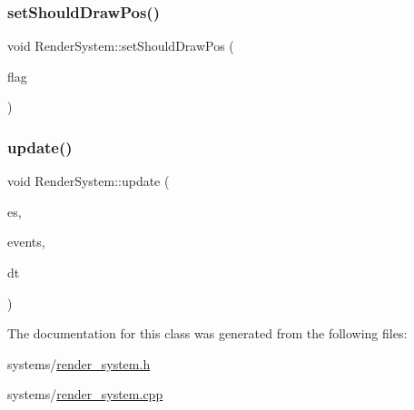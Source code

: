 \mbox{\label{classRenderSystem_a4877dc8f72b552e4127628fd91e3a06d}} 
\subsubsection{\texorpdfstring{set\+Should\+Draw\+Pos()}{setShouldDrawPos()}}
{\footnotesize\ttfamily void Render\+System\+::set\+Should\+Draw\+Pos (\begin{DoxyParamCaption}\item[{bool}]{flag }\end{DoxyParamCaption})}

\mbox{\label{classRenderSystem_aacda55df4d6fc4ffefdad3b38b4f25f8}} 
\subsubsection{\texorpdfstring{update()}{update()}}
{\footnotesize\ttfamily void Render\+System\+::update (\begin{DoxyParamCaption}\item[{ex\+::\+Entity\+Manager \&}]{es,  }\item[{ex\+::\+Event\+Manager \&}]{events,  }\item[{ex\+::\+Time\+Delta}]{dt }\end{DoxyParamCaption})\hspace{0.3cm}{\ttfamily [override]}}



The documentation for this class was generated from the following files\+:\begin{DoxyCompactItemize}
\item 
systems/\hyperlink{render__system_8h}{render\+\_\+system.\+h}\item 
systems/\hyperlink{render__system_8cpp}{render\+\_\+system.\+cpp}\end{DoxyCompactItemize}
